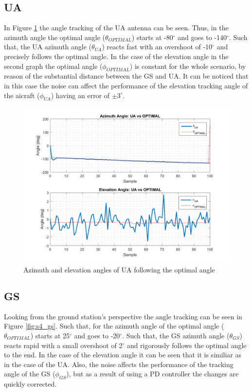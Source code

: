 \subsection{UA}
In Figure \ref{fig:s4_ua} the angle tracking of the UA antenna can be seen. Thus, in the azimuth angle the optimal angle ($\theta_{OPTIMAL}$) starts at -80$^{\circ}$ and goes to -140$^{\circ}$. Such that, the UA azimuth angle ($\theta_{UA}$) reacts fast with an overshoot of -10$^{\circ}$ and precisely follows the optimal angle. In the case of the elevation angle in the second graph the optimal angle ($\phi_{OPTIMAL}$) is constant for the whole scenario, by reason of the substantial distance between the GS and UA. It can be noticed that in this case the noise can affect the performance of the elevation tracking angle of the aicraft ($\phi_{UA}$) having an error of $\pm3^{\circ}$. 

\begin{figure}[H]
	\centering
	\includegraphics[scale=0.8]{figures/s4_ua.png}
	\caption{Azimuth and elevation angles of UA following the optimal angle}
	\label{fig:s4_ua}
\end{figure}

\subsection{GS}
Looking from the ground station's perspective the angle tracking can be seen in Figure \ref{fig:s4_gs}. Such that, for the azimuth angle of the optimal angle ($\theta_{OPTIMAL}$) starts at 25$^{\circ}$ and goes to -20$^{\circ}$. Such that, the GS azimuth angle ($\theta_{GS}$) reacts rapid with a small overshoot of 2$^{\circ}$ and rigorously follows the optimal angle to the end. In the case of the elevation angle it can be seen that it is similiar as in the case of the UA. Also, the noise affects the performance of the tracking angle of the GS ($\phi_{GS}$), but as a result of using a PD controller the changes are quickly corrected.

